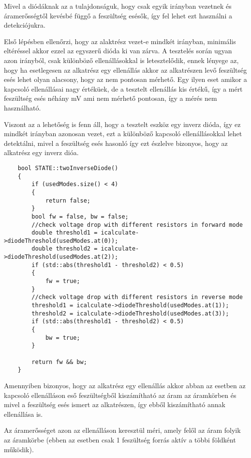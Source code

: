 Mivel a diódáknak az a tulajdonságuk, hogy csak egyik irányban vezetnek
és áramerősségtől kevésbé függő a feszültség esésők, így fel lehet ezt
használni a detekciójukra.

Első lépésben ellenőrzi, hogy az alaktrész vezet-e mindkét irányban, 
minimális eltéréssel akkor ezzel az egyszerű dióda ki van zárva.
A tesztelés során ugyan azon irányból, csak különböző ellenállásokkal
is letesztelődik, ennek lényege az, hogy ha esetlegesen az alkatrész
egy ellenállás akkor az alkatrészen levő feszültség esés lehet olyan alacsony,
hogy az nem pontosan mérhető. 
Egy ilyen eset amikor a kapcsoló ellenállásai nagy értéküek, de a tesztelt 
ellenállás kis értékű, így
a mért feszültség esés néhány mV ami nem mérhető pontosan, így a 
mérés nem használható. 

Viszont az a lehetőség is fenn áll, hogy a tesztelt eszköz egy
inverz dióda, így ez mindkét irányban azonosan vezet, ezt a különböző
kapcsoló ellenállásokkal lehet detektálni, mivel a feszültség esés hasonló
így ezt észlelve bizonyos, hogy az alkatrész egy inverz dióa.

\begin{lstlisting}
    bool STATE::twoInverseDiode()
    {
        if (usedModes.size() < 4)
        {
            return false;
        }
        bool fw = false, bw = false;
        //check voltage drop with different resistors in forward mode
        double threshold1 = icalculate->diodeThreshold(usedModes.at(0));
        double threshold2 = icalculate->diodeThreshold(usedModes.at(2));
        if (std::abs(threshold1 - threshold2) < 0.5)
        {
            fw = true;
        }
        //check voltage drop with different resistors in reverse mode
        threshold1 = icalculate->diodeThreshold(usedModes.at(1));
        threshold2 = icalculate->diodeThreshold(usedModes.at(3));
        if (std::abs(threshold1 - threshold2) < 0.5)
        {
            bw = true;
        }
        
        return fw && bw;
    }
\end{lstlisting}


Amennyiben bizonyos, hogy az alkatrész egy ellenállás akkor
abban az esetben az kapcsoló ellenálláson eső feszültségből kiszámítható
az áram az áramkörben és mivel a feszültség esés ismert az alkatrészen,
így ebből kiszámítható annak ellenállása is.

Az áramerősséget azon az ellenálláson keresztül méri, amely 
felől az áram folyik az áramkörbe (ebben az esetben csak 1 feszültség
forrás aktív a többi földként működik).

